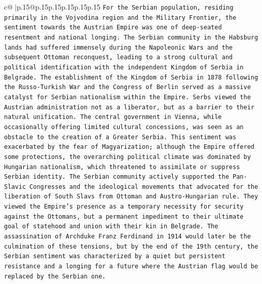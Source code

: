 \documentclass{article}
\begin{document}
{\begin{supertabular}{c@{$\;$}|p{.15\linewidth}@{}p{.15\linewidth}p{.15\linewidth}p{.15\linewidth}p{.15\linewidth}p{.15\linewidth}}
{{{\texttt{For the Serbian population, residing primarily in the Vojvodina region and the Military Frontier, the sentiment towards the Austrian Empire was one of deep{-}seated resentment and national longing. The Serbian community in the Habsburg lands had suffered immensely during the Napoleonic Wars and the subsequent Ottoman reconquest, leading to a strong cultural and political identification with the independent Kingdom of Serbia in Belgrade. The establishment of the Kingdom of Serbia in 1878 following the Russo{-}Turkish War and the Congress of Berlin served as a massive catalyst for Serbian nationalism within the Empire. Serbs viewed the Austrian administration not as a liberator, but as a barrier to their natural unification. The central government in Vienna, while occasionally offering limited cultural concessions, was seen as an obstacle to the creation of a Greater Serbia. This sentiment was exacerbated by the fear of Magyarization; although the Empire offered some protections, the overarching political climate was dominated by Hungarian nationalism, which threatened to assimilate or suppress Serbian identity. The Serbian community actively supported the Pan{-}Slavic Congresses and the ideological movements that advocated for the liberation of South Slavs from Ottoman and Austro{-}Hungarian rule. They viewed the Empire's presence as a temporary necessity for security against the Ottomans, but a permanent impediment to their ultimate goal of statehood and union with their kin in Belgrade. The assassination of Archduke Franz Ferdinand in 1914 would later be the culmination of these tensions, but by the end of the 19th century, the Serbian sentiment was characterized by a quiet but persistent resistance and a longing for a future where the Austrian flag would be replaced by the Serbian one.} \\
\\ 
}}}
\end{supertabular}}
\end{document}
